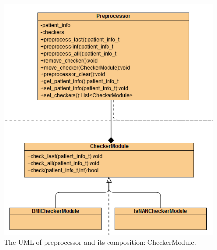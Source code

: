 \documentclass{article}
\begin{document}
\begin{figure}[ht]
  \centering
  \includegraphics[scale = 0.35]{asset/preprocessor_and_detector/PRE_preprocessor.png}
  \caption{The UML of preprocessor and its composition: CheckerModule.}
  \label{fig:pre_preprocessor}
\end{figure}
\end{document}
